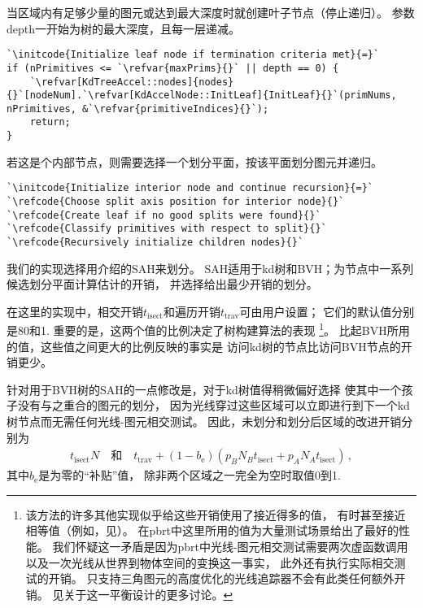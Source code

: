 当区域内有足够少量的图元或达到最大深度时就创建叶子节点（停止递归）。
参数{\ttfamily depth}一开始为树的最大深度，且每一层递减。
\begin{lstlisting}
`\initcode{Initialize leaf node if termination criteria met}{=}`
if (nPrimitives <= `\refvar{maxPrims}{}` || depth == 0) {
    `\refvar[KdTreeAccel::nodes]{nodes}{}`[nodeNum].`\refvar[KdAccelNode::InitLeaf]{InitLeaf}{}`(primNums, nPrimitives, &`\refvar{primitiveIndices}{}`);
    return;
}
\end{lstlisting}

若这是个内部节点，则需要选择一个划分平面，按该平面划分图元并递归。
\begin{lstlisting}
`\initcode{Initialize interior node and continue recursion}{=}`
`\refcode{Choose split axis position for interior node}{}`
`\refcode{Create leaf if no good splits were found}{}`
`\refcode{Classify primitives with respect to split}{}`
`\refcode{Recursively initialize children nodes}{}`
\end{lstlisting}

我们的实现选择用介绍的SAH来划分。
SAH适用于kd树和BVH；为节点中一系列候选划分平面计算估计的开销，
并选择给出最少开销的划分。

在这里的实现中，相交开销$t_{\text{isect}}$和遍历开销$t_{\text{trav}}$可由用户设置；
它们的默认值分别是80和1.
重要的是，这两个值的比例决定了树构建算法的表现
\footnote{该方法的许多其他实现似乎给这些开销使用了接近得多的值，
    有时甚至接近相等值（例如，见\citet{hurley2002fast}）。
    在pbrt中这里所用的值为大量测试场景给出了最好的性能。
    我们怀疑这一矛盾是因为pbrt中光线-图元相交测试需要两次虚函数调用
    以及一次光线从世界到物体空间的变换这一事实，
    此外还有执行实际相交测试的开销。
    只支持三角图元的高度优化的光线追踪器不会有此类任何额外开销。
    见关于这一平衡设计的更多讨论。}。
比起BVH所用的值，这些值之间更大的比例反映的事实是
访问kd树的节点比访问BVH节点的开销更少。

针对用于BVH树的SAH的一点修改是，对于kd树值得稍微偏好选择
使其中一个孩子没有与之重合的图元的划分，
因为光线穿过这些区域可以立即进行到下一个kd树节点而无需任何光线-图元相交测试。
因此，未划分和划分后区域的改进开销分别为
\begin{align*}
    t_{\text{isect}}N \quad \text{和} \quad t_{\text{trav}}+(1-b_{\mathrm{e}})(p_BN_Bt_{\text{isect}}+p_AN_At_{\text{isect}})\, ,
\end{align*}
其中$b_{\mathrm{e}}$是为零的“补贴”值，
除非两个区域之一完全为空时取值0到1.


